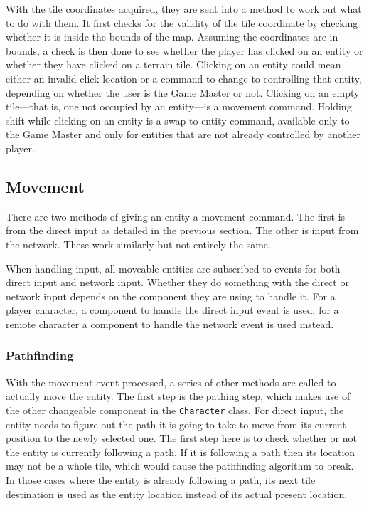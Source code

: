 With the tile coordinates acquired, they are sent into a method to work out what to do with them. It first checks for the validity of the tile coordinate by checking whether it is inside the bounds of the map. Assuming the coordinates are in bounds, a check is then done to see whether the player has clicked on an entity or whether they have clicked on a terrain tile. Clicking on an entity could mean either an invalid click location or a command to change to controlling that entity, depending on whether the user is the Game Master or not. Clicking on an empty tile---that is, one not occupied by an entity---is a movement command. Holding shift while clicking on an entity is a swap-to-entity command, available only to the Game Master and only for entities that are not already controlled by another player.

\subsection{Movement}
There are two methods of giving an entity a movement command. The first is from the direct input as detailed in the previous section. The other is input from the network. These work similarly but not entirely the same.

When handling input, all moveable entities are subscribed to events for both direct input and network input. Whether they do something with the direct or network input depends on the component they are using to handle it. For a player character, a component to handle the direct input event is used; for a remote character a component to handle the network event is used instead.

\subsubsection{Pathfinding}
With the movement event processed, a series of other methods are called to actually move the entity. The first step is the pathing step, which makes use of the other changeable component in the \texttt{Character} class. For direct input, the entity needs to figure out the path it is going to take to move from its current position to the newly selected one. The first step here is to check whether or not the entity is currently following a path. If it is following a path then its location may not be a whole tile, which would cause the pathfinding algorithm to break. In those cases where the entity is already following a path, its next tile destination is used as the entity location instead of its actual present location.


